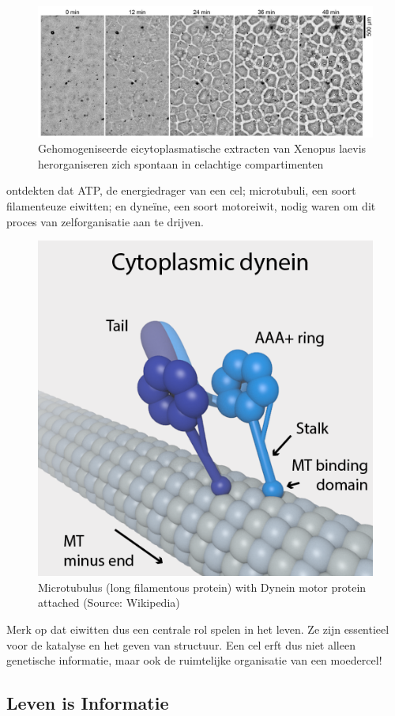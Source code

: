 \documentclass[
  11pt,
]{book}
\begin{document}
\begin{figure}

{\centering \includegraphics[width=1\linewidth]{./figs/selforganisation} 

}

\caption{Gehomogeniseerde eicytoplasmatische extracten van Xenopus laevis herorganiseren zich spontaan in celachtige compartimenten \citep{Cheng2019}}\label{fig:selforganisation}
\end{figure}

\citet{Cheng2019} ontdekten dat ATP, de energiedrager van een cel; microtubuli, een soort filamenteuze eiwitten; en dyneïne, een soort motoreiwit, nodig waren om dit proces van zelforganisatie aan te drijven.

\begin{figure}

{\centering \includegraphics[width=0.3\linewidth]{./figs/DyneinHeavyChainOnMT} 

}

\caption{Microtubulus (long filamentous protein) with Dynein motor protein attached (Source:  Wikipedia)}\label{fig:dynein}
\end{figure}

Merk op dat eiwitten dus een centrale rol spelen in het leven. Ze zijn essentieel voor de katalyse en het geven van structuur. Een cel erft dus niet alleen genetische informatie, maar ook de ruimtelijke organisatie van een moedercel!

\newpage

\hypertarget{lifeInformation}{%
\subsection{Leven is Informatie}\label{lifeInformation}}
\end{document}
